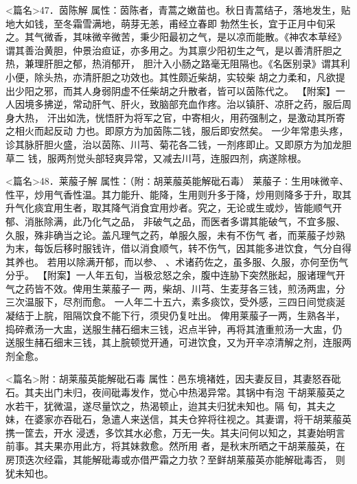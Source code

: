 \documentclass[a4paper,12pt,UTF8,twoside]{ctexbook}
\begin{document}
<篇名>47．茵陈解
属性：茵陈者，青蒿之嫩苗也。秋日青蒿结子，落地发生，贴地大如钱，至冬霜雪满地，萌芽无恙，甫经立春即 
勃然生长，宜于正月中旬采之。其气微香，其味微辛微苦，秉少阳最初之气，是以凉而能散。《神农本草经》 
谓其善治黄胆，仲景治疸证，亦多用之。为其禀少阳初生之气，是以善清肝胆之热，兼理肝胆之郁，热消郁开， 
胆汁入小肠之路毫无阻隔也。《名医别录》谓其利小便，除头热，亦清肝胆之功效也。其性颇近柴胡，实较柴 
胡之力柔和，凡欲提出少阳之邪，而其人身弱阴虚不任柴胡之升散者，皆可以茵陈代之。 
【附案】一人因境多拂逆，常动肝气、肝火，致脑部充血作疼。治以镇肝、凉肝之药，服后周身大热， 
汗出如洗，恍悟肝为将军之官，中寄相火，用药强制之，是激动其所寄之相火而起反动 
力也。即原方为加茵陈二钱，服后即安然矣。 
一少年常患头疼，诊其脉肝胆火盛，治以茵陈、川芎、菊花各二钱，一剂疼即止。又即原方为加龙胆草二 
钱，服两剂觉头部轻爽异常，又减去川芎，连服四剂，病遂除根。 


<篇名>48．莱菔子解
属性：（附∶胡莱菔英能解砒石毒） 
莱菔子∶生用味微辛、性平，炒用气香性温。其力能升、能降，生用则升多于降，炒用则降多于升，取其 
升气化痰宜用生者，取其降气消食宜用炒者。究之，无论或生或炒，皆能顺气开郁、消胀除满，此乃化气之品， 
非破气之品，而医者多谓其能破气，不宜多服、久服，殊非确当之论。盖凡理气之药，单服久服，未有不伤气 
者，而莱菔子炒熟为末，每饭后移时服钱许，借以消食顺气，转不伤气，因其能多进饮食，气分自得其养也。 
若用以除满开郁，而以参、 、术诸药佐之，虽多服、久服，亦何至伤气分乎。 
【附案】一人年五旬，当极忿怒之余，腹中连胁下突然胀起，服诸理气开气之药皆不效。俾用生莱菔子一 
两，柴胡、川芎、生麦芽各三钱，煎汤两盅，分三次温服下，尽剂而愈。 
一人年二十五六，素多痰饮，受外感，三四日间觉痰涎凝结于上脘，阻隔饮食不能下行，须臾仍复吐出。 
俾用莱菔子一两，生熟各半，捣碎煮汤一大盅，送服生赭石细末三钱，迟点半钟，再将其渣重煎汤一大盅，仍 
送服生赭石细末三钱，其上脘顿觉开通，可进饮食，又为开辛凉清解之剂，连服两剂全愈。 

<篇名>附∶胡莱菔英能解砒石毒
属性：邑东境褚姓，因夫妻反目，其妻怒吞砒石。其夫出门未归，夜间砒毒发作，觉心中热渴异常。其锅中有泡 
干胡莱菔英之水若干，犹微温，遂尽量饮之，热渴顿止，迨其夫归犹未知也。隔 
旬，其夫之妹，在婆家亦吞砒石，急遣人来送信，其夫仓猝将往视之。其妻谓，将干胡莱菔英携一筐去，开水 
浸透，多饮其水必愈，万无一失。其夫问何以知之，其妻始明言前事。其夫果亦用此方，将其妹救愈。然所用 
者，是秋末所晒之干胡莱菔英，在房顶迭次经霜，其能解砒毒或亦借严霜之力欤？至鲜胡莱菔英亦能解砒毒否， 
则犹未知也。 
\end{document}
